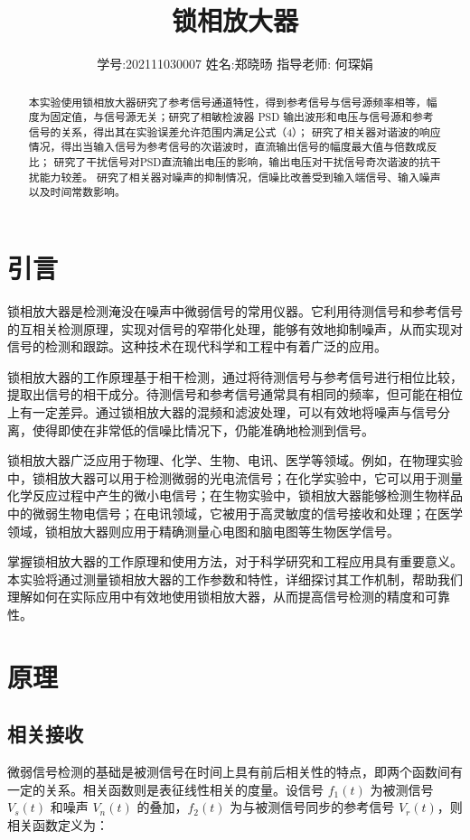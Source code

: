 \documentclass[12pt,a4paper]{article}
\title{\vspace{-4cm}\Large 锁相放大器}  %
\author{\kaishu 学号:202111030007 \hspace{1.5cm} 姓名:郑晓旸 \hspace{1.5cm} 指导老师: 何琛娟}   %
\date{}
\begin{document}
\maketitle

\begin{abstract}
    本实验使用锁相放大器研究了参考信号通道特性，得到参考信号与信号源频率相等，幅度为固定值，与信号源无关；研究了相敏检波器 PSD 输出波形和电压与信号源和参考信号的关系，得出其在实验误差允许范围内满足公式（4）；
    研究了相关器对谐波的响应情况，得出当输入信号为参考信号的次谐波时，直流输出信号的幅度最大值与倍数成反比；
    研究了干扰信号对PSD直流输出电压的影响，输出电压对干扰信号奇次谐波的抗干扰能力较差。
    研究了相关器对噪声的抑制情况，信噪比改善受到输入端信号、输入噪声以及时间常数影响。
\end{abstract}

\section{引言}

锁相放大器是检测淹没在噪声中微弱信号的常用仪器。它利用待测信号和参考信号的互相关检测原理，实现对信号的窄带化处理，能够有效地抑制噪声，从而实现对信号的检测和跟踪。这种技术在现代科学和工程中有着广泛的应用。

锁相放大器的工作原理基于相干检测，通过将待测信号与参考信号进行相位比较，提取出信号的相干成分。待测信号和参考信号通常具有相同的频率，但可能在相位上有一定差异。通过锁相放大器的混频和滤波处理，可以有效地将噪声与信号分离，使得即使在非常低的信噪比情况下，仍能准确地检测到信号。

锁相放大器广泛应用于物理、化学、生物、电讯、医学等领域。例如，在物理实验中，锁相放大器可以用于检测微弱的光电流信号；在化学实验中，它可以用于测量化学反应过程中产生的微小电信号；在生物实验中，锁相放大器能够检测生物样品中的微弱生物电信号；在电讯领域，它被用于高灵敏度的信号接收和处理；在医学领域，锁相放大器则应用于精确测量心电图和脑电图等生物医学信号。

掌握锁相放大器的工作原理和使用方法，对于科学研究和工程应用具有重要意义。本实验将通过测量锁相放大器的工作参数和特性，详细探讨其工作机制，帮助我们理解如何在实际应用中有效地使用锁相放大器，从而提高信号检测的精度和可靠性。

\section{原理}
\subsection{相关接收}
微弱信号检测的基础是被测信号在时间上具有前后相关性的特点，即两个函数间有一定的关系。相关函数则是表征线性相关的度量。设信号 $f_1(t)$ 为被测信号 $V_s(t)$ 和噪声 $V_n(t)$ 的叠加，$f_2(t)$ 为与被测信号同步的参考信号 $V_r(t)$，则相关函数定义为：
\end{document}
